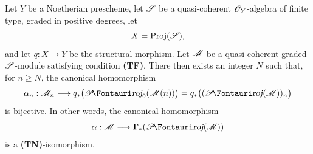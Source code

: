 \begin{theorem}[2.3.1]
\label{III.2.3.1}
Let $Y$ be a Noetherian prescheme, let $\mathscr{S}$ be a quasi-coherent $\mathscr{O}_Y$-algebra of finite type, graded in positive degrees, let
\[
  X=\operatorname{Proj}(\mathscr{S}),
\]
and let $q:X\to Y$ be the structural morphism.
Let $\mathscr{M}$ be a quasi-coherent graded $\mathscr{S}$-module satisfying condition \textbf{(TF)}.
There then exists an integer $N$ such that, for $n\geq N$, the canonical homomorphism 
\[
  \alpha_n:\sh{M}_n
  \longrightarrow q_*\bigl(\shProj_0(\sh{M}(n))\bigr)
  =q_*\bigl((\shProj(\sh{M}))_n\bigr)
\]
is bijective.
In other words, the canonical homomorphism
\[
  \alpha:\sh{M}\longrightarrow\bbGamma_*(\shProj(\sh{M}))
\]
is a \textbf{(TN)}-isomorphism.
\end{theorem}

